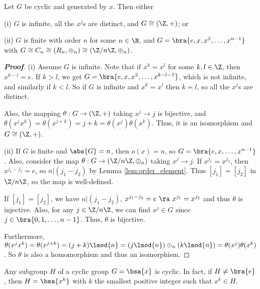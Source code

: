\begin{proposition}\label{pro:cyclic_group_isomorphism_infinite_finite}
Let $G$ be cyclic and generated by $x$. Then either
\ben
\item [(i)] $G$ is infinite, all the $x^j$s are distinct, and $G\cong (\Z,+)$; or
\item [(ii)] $G$ is finite with order $n$ for some $n\in\N$, and $G=\bra{e,x,x^2,\dots,x^{n-1}}$ with $G\cong C_n\cong (R_n,\oplus_n) \cong (\Z/n\Z,\oplus_n)$.
\een
\end{proposition}

\begin{proof}[\bf Proof]
\ben
\item [(i)] Assume $G$ is infinite. Note that if $x^k = x^l$ for some $k,l\in \Z$, then $x^{k-l} =e$. If $k>l$, we get $G =\bra{e,x,x^2,\dots,x^{k-l-1}}$, which is not infinite, and similarly if $k<l$. So if $G$ is infinite and $x^k = x^l$ then $k=l$, so all the $x^j$s are distinct.

Also, the mapping $\theta: G\to (\Z,+)$ taking $x^j\to j$ is bijective, and $\theta(x^jx^k) = \theta(x^{j+k}) = j+k = \theta(x^j)\theta(x^k)$. Thus, it is an isomorphism and $G\cong (\Z,+)$.

\item [(ii)] If $G$ is finite and $\abs{G}=n$, then $o(x) = n$, so $G=\bra{e,x,\dots,x^{n-1}}$. Also, consider the map $\theta:G\to (\Z/n\Z,\oplus_n)$ taking $x^j \to j$. If $x^{j_1} = x^{j_2}$, then $x^{j_1-j_2} =e$, so $n|(j_1-j_2)$ by Lemma \ref{lem:order_element}. Thus $[j_1] = [j_2]$ in $\Z/n\Z$, so the map is well-defined.

If $[j_1] = [j_2]$, we have $n|(j_1-j_2)$, $x^{j_1-j_2} =e \ \ra \ x^{j_1} = x^{j_2}$ and thus $\theta$ is injective. Also, for any $j\in \Z/n\Z$, we can find $x^j\in G$ since $j\in \bra{0,1,\dots,n-1}$. Thus, $\theta$ is bijective.

Furthermore, $\theta(x^jx^k) = \theta(x^{j+k}) = (j+k) \lmod{n} = (j \lmod{ n}) \oplus_n (k \lmod{n}) = \theta(x^j)\theta(x^k)$. So $\theta$ is also a homomorphism and thus an isomorphism.
\een
\end{proof}


\begin{lemma}\label{lem:subgroup_of_cyclic_group_is_cyclic}
Any subgroup $H$ of a cyclic group $G=\bsa{x}$ is cyclic. In fact, if $H\neq \bra{e}$, then $H=\bsa{x^k}$ with $k$ the smallest positive integer such that $x^k \in H$.
\end{lemma}

